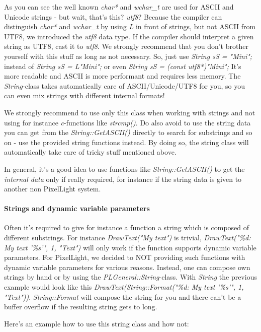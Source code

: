 As you can see the well known \emph{char*} and \emph{wchar\_t} are used for ASCII and Unicode strings - but wait, that's this? \emph{utf8}? Because the compiler can distinguish \emph{char*} and \emph{wchar\_t} by using \emph{L} in front of strings, but not ASCII from UTF8, we introduced the \emph{utf8} data type. If the compiler should interpret a given string as UTF8, cast it to \emph{utf8}. We strongly recommend that you don't brother yourself with this stuff as long as not necessary. So, just use \emph{String sS = "Mini";} instead of \emph{String sS = L"Mini";} or even \emph{String sS = (const utf8*)"Mini";} It's more readable and ASCII is more performant and requires less memory. The \emph{String}-class takes automatically care of ASCII/Unicode/UTF8 for you, so you can even mix strings with different internal formats!

We strongly recommend to use only this class when working with strings and not using for instance \emph{c}-functions like \emph{strcmp()}. Do also avoid to use the string data you can get from the \emph{String::GetASCII()} directly to search for substrings and so on - use the provided string functions instead. By doing so, the string class will automatically take care of tricky stuff mentioned above.

In general, it's a good idea to use functions like \emph{String::GetASCII()} to get the \emph{internal data} only if really required, for instance if the string data is given to another non PixelLight system.


\paragraph{Strings and dynamic variable parameters}
Often it's required to give for instance a function a string which is composed of different substrings. For instance \emph{DrawText("My text")} is trivial, \emph{DrawText("\%d: My text '\%s'", 1, "Text")} will only work if the function supports dynamic variable parameters. For PixelLight, we decided to NOT providing such functions with dynamic variable parameters for various reasons. Instead, one can compose own strings by hand or by using the \emph{PLGeneral::String}-class. With \emph{String} the previous example would look like this \emph{DrawText(String::Format("\%d: My text '\%s'", 1, "Text"))}. \emph{String::Format} will compose the string for you and there can't be a buffer overflow if the resulting string gets to long.

Here's an example how to use this string class and how not:

